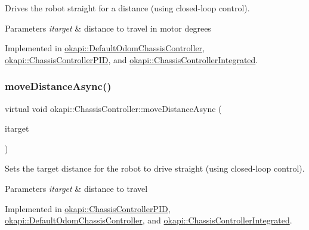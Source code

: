 Drives the robot straight for a distance (using closed-\/loop control).


\begin{DoxyParams}{Parameters}
{\em itarget} & distance to travel in motor degrees \\
\hline
\end{DoxyParams}


Implemented in \mbox{\hyperlink{classokapi_1_1DefaultOdomChassisController_a42abd53b9a0b96b722186ada8eb13d98}{okapi\+::\+Default\+Odom\+Chassis\+Controller}}, \mbox{\hyperlink{classokapi_1_1ChassisControllerPID_a711b80afa09a80233372cc37267606d5}{okapi\+::\+Chassis\+Controller\+P\+ID}}, and \mbox{\hyperlink{classokapi_1_1ChassisControllerIntegrated_ab0361bc7bb5dc0b4ac4c990c1b9dd14f}{okapi\+::\+Chassis\+Controller\+Integrated}}.

\mbox{\label{classokapi_1_1ChassisController_a67a17268b871a4f1ae74d67891cbf5dd}} 
\subsubsection{\texorpdfstring{moveDistanceAsync()}{moveDistanceAsync()}\hspace{0.1cm}{\footnotesize\ttfamily [1/2]}}
{\footnotesize\ttfamily virtual void okapi\+::\+Chassis\+Controller\+::move\+Distance\+Async (\begin{DoxyParamCaption}\item[{Q\+Length}]{itarget }\end{DoxyParamCaption})\hspace{0.3cm}{\ttfamily [pure virtual]}}

Sets the target distance for the robot to drive straight (using closed-\/loop control).


\begin{DoxyParams}{Parameters}
{\em itarget} & distance to travel \\
\hline
\end{DoxyParams}


Implemented in \mbox{\hyperlink{classokapi_1_1ChassisControllerPID_affad4aa1b0bd54db728ac600493a6c4c}{okapi\+::\+Chassis\+Controller\+P\+ID}}, \mbox{\hyperlink{classokapi_1_1DefaultOdomChassisController_a61ca0d303fcbfd08932157af9adbbb12}{okapi\+::\+Default\+Odom\+Chassis\+Controller}}, and \mbox{\hyperlink{classokapi_1_1ChassisControllerIntegrated_afc97bc450a090d91b57bc6353b4a6972}{okapi\+::\+Chassis\+Controller\+Integrated}}.

